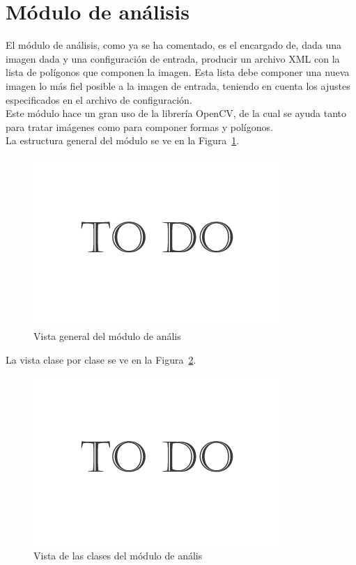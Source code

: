 \section{Módulo de análisis}



El módulo de análisis, como ya se ha comentado, es el encargado de, dada una imagen dada y una configuración de entrada, producir un archivo XML con la lista de polígonos que componen la imagen. Esta lista debe componer una nueva imagen lo más fiel posible a la imagen de entrada, teniendo en cuenta los ajustes especificados en el archivo de configuración.\\

Este módulo hace un gran uso de la librería OpenCV, de la cual se ayuda tanto para tratar imágenes como para componer formas y polígonos.\\

La estructura general del módulo se ve en la Figura~\ref{fig:diagramageneralPHIC}.\\

		\begin{figure}[htbp]
		\centering
		\includegraphics[scale=0.47]{graphics/todo.png}
		\caption{Vista general del módulo de anális}
		\label{fig:diagramageneralPHIC}
		\end{figure}
	
La vista clase por clase se ve en la Figura~\ref{fig:diagramaclasesPHIC}.\\

		\begin{figure}[htbp]
		\centering
		\includegraphics[scale=0.47]{graphics/todo.png}
		\caption{Vista de las clases del módulo de anális}
		\label{fig:diagramaclasesPHIC}
		\end{figure}
		
